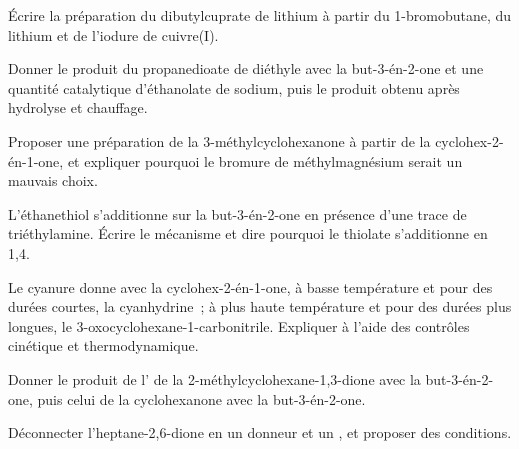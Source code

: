 \begin{exercise}[$\star$]\label{exo:b2:conjugate-additions:3}
Écrire la préparation du dibutylcuprate de lithium à partir du 1-bromobutane, du lithium et de l'iodure de cuivre(I).
\end{exercise}

\begin{exercise}[$\star$]\label{exo:b2:conjugate-additions:4}
Donner le produit du propanedioate de diéthyle avec la but-3-én-2-one et une quantité catalytique
d'éthanolate de sodium, puis le produit obtenu après hydrolyse et chauffage.
\end{exercise}

\begin{exercise}[$\star\star$]\label{exo:b2:conjugate-additions:5}
Proposer une préparation de la 3-méthylcyclohexanone à partir de la cyclohex-2-én-1-one, et expliquer
pourquoi le bromure de méthylmagnésium serait un mauvais choix.
\end{exercise}

\begin{exercise}[$\star\star$]\label{exo:b2:conjugate-additions:6}
L'éthanethiol s'additionne sur la but-3-én-2-one en présence d'une trace de triéthylamine. Écrire le
mécanisme et dire pourquoi le thiolate s'additionne en 1,4.
\end{exercise}

\begin{exercise}[$\star\star$]\label{exo:b2:conjugate-additions:7}
Le cyanure donne avec la cyclohex-2-én-1-one, à basse température et pour des durées courtes, la
cyanhydrine~; à plus haute température et pour des durées plus longues, le
3-oxocyclohexane-1-carbonitrile. Expliquer à l'aide des contrôles cinétique et thermodynamique.
\end{exercise}

\begin{exercise}[$\star\star$]\label{exo:b2:conjugate-additions:8}
Donner le produit de l' de la 2-méthylcyclohexane-1,3-dione avec la
but-3-én-2-one, puis celui de la cyclohexanone avec la but-3-én-2-one.
\end{exercise}

\begin{exercise}[$\star\star$]\label{exo:b2:conjugate-additions:9}
Déconnecter l'heptane-2,6-dione en un donneur et un , et proposer des conditions.
\end{exercise}

